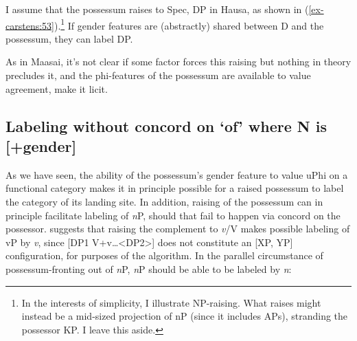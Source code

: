 \documentclass[output=paper
,modfonts
,nonflat]{langsci/langscibook}
\begin{document}
I assume that the possessum raises to Spec, DP in Hausa, as shown in (\ref{ex-carstens:53}).\footnote{In the interests of simplicity, I illustrate NP-raising. What raises might instead be a mid-sized projection of nP (since it includes APs), stranding the possessor KP. I leave this aside.} If gender features are (abstractly) shared between D and the possessum, they can label DP. 

\begin{figure}[!h]
	\begin{exe}
	\end{exe} \vspace{-0.8cm}
\end{figure}
\noindent As in Maasai, it’s not clear if some factor forces this raising but nothing in theory precludes it, and the phi-features of the possessum are available to value agreement, make it licit.

\subsection{Labeling without concord on ‘of’ where N is [+gender]} \label{sec-carstens:6.4}
As we have seen, the ability of the possessum’s gender feature to value uPhi on a functional category makes it in principle possible for a raised possessum to label the category of its landing site. In addition, raising of the possessum can in principle facilitate labeling of \textit{n}P, should that fail to happen via concord on the possessor. \citet[44]{Chomsky2013} suggests that raising the complement to \textit{v}/V makes possible labeling of vP by \textit{v}, since [DP1 V+v…<DP2>] does not constitute an [XP, YP] configuration, for purposes of the algorithm. In the parallel circumstance of possessum-fronting out of \textit{n}P, \textit{n}P should be able to be labeled by \textit{n}:
\end{document}
